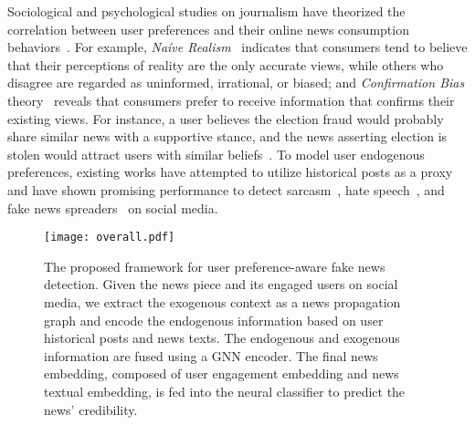 \documentclass[sigconf]{acmart}
\newcommand\UPFD{\xspace}
\begin{document}
Sociological and psychological studies on journalism have theorized the correlation between user preferences and their online news consumption behaviors~\cite{shu2019studying}.
For example, \textit{Na\'ive Realism}~\cite{ross1995naive} indicates that consumers tend to believe that their perceptions of reality are the only accurate views, while others who disagree are regarded as uninformed, irrational, or biased;
and \textit{Confirmation Bias} theory~\cite{nickerson1998confirmation} reveals that consumers prefer to receive information that confirms their existing views.
For instance, a user believes the election fraud would probably share similar news with a supportive stance, and the news asserting election is stolen would attract users with similar beliefs~\cite{abilov2021voterfraud2020}.
To model user endogenous preferences, existing works have attempted to utilize historical posts as a proxy and have shown promising performance to detect sarcasm~\cite{khattri2015your}, hate speech~\cite{qian2018leveraging}, and fake news spreaders~\cite{rangel2020overview} on social media.


\begin{figure*}
    \centering
    \texttt{[image: overall.pdf]}
    \caption{\small The proposed \UPFD framework for user preference-aware fake news detection. Given the news piece and its engaged users on social media, we extract the exogenous context as a news propagation graph and encode the endogenous information based on user historical posts and news texts. The endogenous and exogenous information are fused using a GNN encoder. The final news embedding, composed of user engagement embedding and news textual embedding, is fed into the neural classifier to predict the news' credibility.}
    \label{fig:overall}
\end{figure*}
\end{document}
